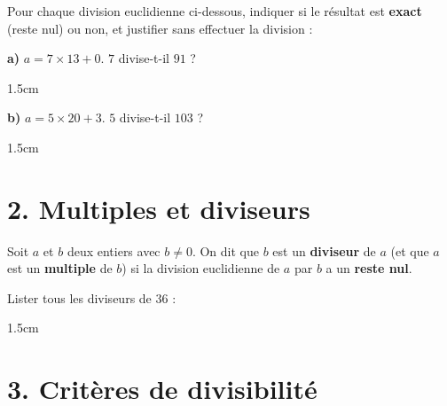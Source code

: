 \documentclass[a4paper]{book}
\begin{document}
    \begin{exemple}
        Pour chaque division euclidienne ci-dessous, indiquer si le résultat est \textbf{exact} (reste nul) ou non, et justifier sans effectuer la division :

        \medskip
        \noindent
        \begin{minipage}[t]{0.45\textwidth}
            \textbf{a)} $a = 7 \times 13 + 0$. \quad $7$ divise-t-il $91$ ?
            \begin{ZoneReponse}{1.5cm}
            \end{ZoneReponse}
        \end{minipage}
        \hfill
        \begin{minipage}[t]{0.45\textwidth}
            \textbf{b)} $a = 5 \times 20 + 3$. \quad $5$ divise-t-il $103$ ?
            \begin{ZoneReponse}{1.5cm}
            \end{ZoneReponse}
        \end{minipage}
    \end{exemple}


\section*{2. Multiples et diviseurs}

    \begin{definition}
        Soit $a$ et $b$ deux entiers avec $b \neq 0$. On dit que $b$ est un \textbf{diviseur} de $a$ (et que $a$ est un \textbf{multiple} de $b$) si la division euclidienne de $a$ par $b$ a un \textbf{reste nul}.
    \end{definition}

    \begin{exemple}
        Lister tous les diviseurs de $36$ :
        \begin{ZoneReponse}{1.5cm}
        \end{ZoneReponse}
    \end{exemple}



\newpage

\section*{3. Critères de divisibilité}
\end{document}
